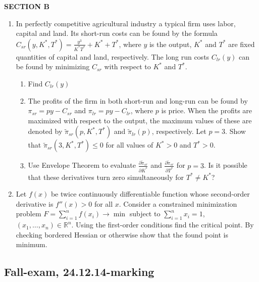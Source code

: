 \documentclass[12pt]{article} %
\theoremstyle{definition} %
\begin{document}
\textbf{SECTION B}

\begin{enumerate}[resume]
\item In perfectly competitive agricultural industry a typical firm uses labor, capital and land. Its short-run costs can be found by the formula $C_{sr}(y,K^*,T^*)=\frac{y^3}{K^*T^*}+K^*+T^*$, where $y$  is the output, $K^*$  and $T^*$  are fixed quantities of capital and land, respectively.
The long run costs $C_{lr}(y)$ can be found by minimizing $C_{sr}$ with respect to $K^*$  and $T^*$.
\begin{enumerate}
\item Find  $C_{lr}(y)$
\item The profits of the firm in both short-run and long-run can be found by $\pi_{sr}=py-C_{sr}$  and   $\pi_{lr}=py-C_{lr}$, where $p$ is price. When the profits are maximized with respect to the output, the maximum values of these are denoted by $\tilde{\pi}_{sr}(p,K^*,T^*)$ and $\tilde{\pi}_{lr}(p)$, respectively. Let $p=3$. Show that $\tilde{\pi}_{sr}(3,K^*,T^*) \leq 0$ for all values of  $K^*>0$  and  $T^*>0$.
\item Use Envelope Theorem to evaluate $\frac{\partial \tilde{\pi}_{sr}}{\partial K^*}$ and $\frac{\partial \tilde{\pi}_{sr}}{\partial T^*}$ for $p=3$. Is it possible that these derivatives turn zero simultaneously for $T^* \neq K^*$?
\end{enumerate}

\item Let $f(x)$ be twice continuously differentiable function whose second-order derivative is $f''(x)>0$ for all $x$. Consider a constrained minimization problem $F=\sum_{i=1}^n f(x_i) \to \min$
subject to $\sum_{i=1}^n x_i = 1$,  $(x_1, \ldots, x_n)\in \mathbb{R}^n$. Using the first-order conditions find the critical point. By checking bordered Hessian or otherwise show that the found point is minimum.
\end{enumerate}

\subsection{Fall-exam, 24.12.14-marking}
\end{document}
